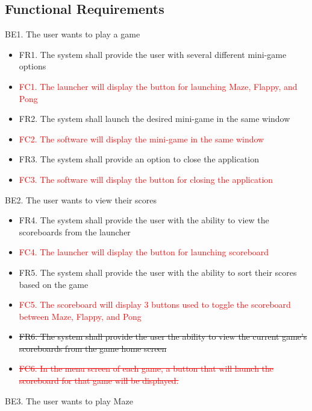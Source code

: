 \documentclass[12pt, titlepage]{article}
\begin{document}
\subsection{Functional Requirements}
    BE1. The user wants to play a game
    \begin{itemize}
    \item FR1. The system shall provide the user with several different mini-game options
    \item \textcolor{red}{FC1. The launcher will display the button for launching Maze, Flappy, and Pong}
    \item FR2. The system shall launch the desired mini-game in the same window
    \item \textcolor{red}{FC2. The software will display the mini-game in the same window}
    \item FR3. The system shall provide an option to close the application
    \item \textcolor{red}{FC3. The software will display the button for closing the application}
    \end{itemize}
    BE2. The user wants to view their scores
    \begin{itemize}
        \item FR4. The system shall provide the user with the ability to view the scoreboards from the launcher
        \item \textcolor{red}{FC4. The launcher will display the button for launching scoreboard}
        \item FR5. The system shall provide the user with the ability to sort their scores based on the game
        \item \textcolor{red}{FC5. The scoreboard will display 3 buttons used to toggle the scoreboard between Maze, Flappy, and Pong}
        \item \sout{FR6. The system shall provide the user the ability to view the current game’s scoreboards from the game home screen}
        \item \textcolor{red}{\sout{FC6. In the menu screen of each game, a button that will launch the scoreboard for that game will be displayed.}}
    \end{itemize}
    BE3. The user wants to play Maze
\end{document}
